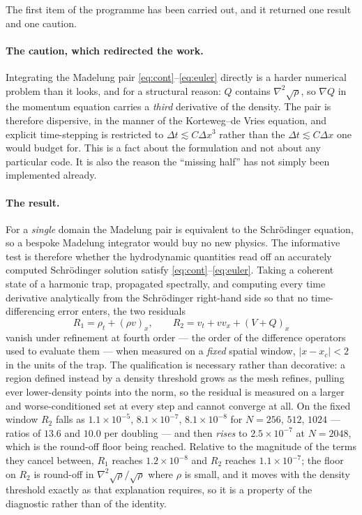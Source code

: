 \documentclass[11pt]{article}
\newcommand{\grad}{\nabla}
\begin{document}
The first item of the programme has been carried out, and it returned one result and one caution.

\paragraph{The caution, which redirected the work.} Integrating the Madelung pair
\eqref{eq:cont}--\eqref{eq:euler} directly is a harder numerical problem than it looks, and for a
structural reason: $Q$ contains $\grad^2\sqrt\rho$, so $\grad Q$ in the momentum equation carries a
\emph{third} derivative of the density. The pair is therefore dispersive, in the manner of the
Korteweg--de Vries equation, and explicit time-stepping is restricted to $\Delta t \lesssim C\Delta
x^3$ rather than the $\Delta t\lesssim C\Delta x$ one would budget for. This is a fact about the
formulation and not about any particular code. It is also the reason the ``missing half'' has not
simply been implemented already.

\paragraph{The result.} For a \emph{single} domain the Madelung pair is equivalent to the
Schr\"odinger equation, so a bespoke Madelung integrator would buy no new physics. The informative
test is therefore whether the hydrodynamic quantities read off an accurately computed Schr\"odinger
solution satisfy \eqref{eq:cont}--\eqref{eq:euler}. Taking a coherent state of a harmonic trap,
propagated spectrally, and computing every time derivative analytically from the Schr\"odinger
right-hand side so that no time-differencing error enters, the two residuals
\[
R_1=\rho_t+(\rho v)_x,\qquad
R_2=v_t+vv_x+(V+Q)_x
\]
vanish under refinement at fourth order --- the order of the difference operators used to evaluate
them --- when measured on a \emph{fixed} spatial window, $|x-x_c|<2$ in the units of the trap. The
qualification is necessary rather than decorative: a region defined instead by a density threshold
grows as the mesh refines, pulling ever lower-density points into the norm, so the residual is
measured on a larger and worse-conditioned set at every step and cannot converge at all. On the
fixed window $R_2$ falls as $1.1\times10^{-5}$, $8.1\times10^{-7}$, $8.1\times10^{-8}$ for
$N=256$, $512$, $1024$ --- ratios of $13.6$ and $10.0$ per doubling --- and then \emph{rises} to
$2.5\times10^{-7}$ at $N=2048$, which is the round-off floor being reached. Relative to the magnitude of the terms they cancel between, $R_1$ reaches $1.2\times10^{-8}$
and $R_2$ reaches $1.1\times10^{-7}$; the floor on $R_2$ is round-off in $\grad^2\sqrt\rho/\sqrt\rho$
where $\rho$ is small, and it moves with the density threshold exactly as that explanation requires,
so it is a property of the diagnostic rather than of the identity.
\end{document}
